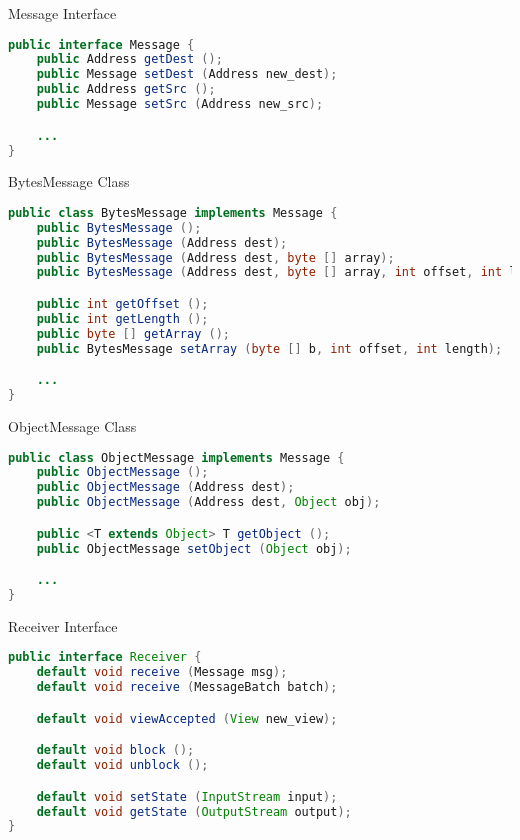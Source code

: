 \begin{frame}[fragile]{Message Interface}
\begin{lstlisting}[language=java,style=mini]
public interface Message {
    public Address getDest ();
    public Message setDest (Address new_dest);
    public Address getSrc ();
    public Message setSrc (Address new_src);

    ...
}
\end{lstlisting}
\end{frame}


\begin{frame}[fragile]{BytesMessage Class}
\begin{lstlisting}[language=java,style=mini]
public class BytesMessage implements Message {
    public BytesMessage ();
    public BytesMessage (Address dest);
    public BytesMessage (Address dest, byte [] array);
    public BytesMessage (Address dest, byte [] array, int offset, int length);

    public int getOffset ();
    public int getLength ();
    public byte [] getArray ();
    public BytesMessage setArray (byte [] b, int offset, int length);

    ...
}
\end{lstlisting}
\end{frame}


\begin{frame}[fragile]{ObjectMessage Class}
\begin{lstlisting}[language=java,style=mini]
public class ObjectMessage implements Message {
    public ObjectMessage ();
    public ObjectMessage (Address dest);
    public ObjectMessage (Address dest, Object obj);

    public <T extends Object> T getObject ();
    public ObjectMessage setObject (Object obj);

    ...
}
\end{lstlisting}
\end{frame}


\begin{frame}[fragile]{Receiver Interface}
\begin{lstlisting}[language=java,style=mini]
public interface Receiver {
    default void receive (Message msg);
    default void receive (MessageBatch batch);

    default void viewAccepted (View new_view);

    default void block ();
    default void unblock ();

    default void setState (InputStream input);
    default void getState (OutputStream output);
}
\end{lstlisting}
\end{frame}



